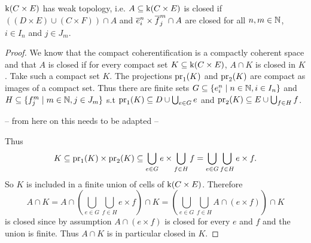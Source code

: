 \begin{lem}\label{lem:weaktopologyproduct}
    $\kif (C \times E)$ has weak topology,
    i.e. $A \subseteq \kif (C \times E)$ is closed if $((D \times E) \cup (C \times F)) \cap A$ and $\closedCell{n}{i} \times \closedCellf{m}{j} \cap A$ are closed for all $n, m \in \bN$, $i \in I_n$ and $j \in J_m$. 
\end{lem}
\begin{proof}
    We know that the compact coherentification is a compactly coherent space and that $A$ is closed if for every compact set $K \subseteq \kif (C \times E)$, $A \cap K$ is closed in $K$.
    Take such a compact set $K$.
    The projections $\pr{1}{K}$ and $\pr{2}{K}$ are compact as images of a compact set. 
    Thus there are finite sets $G \subseteq \{e_i^n \mid n \in \bN, i \in I_n \}$ and $H \subseteq \{f_j^m \mid m \in \bN, j \in J_m \}$ s.t $\pr{1}{K} \subseteq D \cup \bigcup_{e \in G} e$ and $\pr{2}{K} \subseteq E \cup \bigcup_{f \in H} f$.
    
    -- from here on this needs to be adapted -- 
    
    Thus 
    \[K \subseteq \pr{1}{K} \times \pr{2}{K} \subseteq \bigcup_{e \in G} e \times \bigcup_{f \in H} f = \bigcup_{e \in G} \bigcup_{f \in H} e \times f.\] 
    So $K$ is included in a finite union of cells of $\kif (C \times E)$. 
    Therefore 
    \[A \cap K = A \cap \left (\bigcup_{e \in G} \bigcup_{f \in H} e \times f \right )\cap K = \left (\bigcup_{e \in G} \bigcup_{f \in H} A \cap (e \times f)\right ) \cap K\] 
    is closed since by assumption $A \cap (e \times f)$ is closed for every $e$ and $f$ and the union is finite. Thus $A \cap K$ is in particular closed in $K$.
\end{proof}